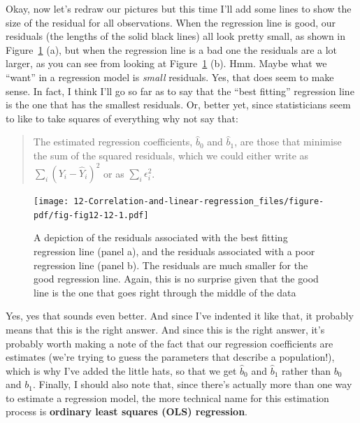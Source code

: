 \documentclass[
  a4paper,
]{book}
\begin{document}
Okay, now let's redraw our pictures but this time I'll add some lines to
show the size of the residual for all observations. When the regression
line is good, our residuals (the lengths of the solid black lines) all
look pretty small, as shown in Figure~\ref{fig-fig12-12} (a), but when
the regression line is a bad one the residuals are a lot larger, as you
can see from looking at Figure~\ref{fig-fig12-12} (b). Hmm. Maybe what
we ``want'' in a regression model is \emph{small} residuals. Yes, that
does seem to make sense. In fact, I think I'll go so far as to say that
the ``best fitting'' regression line is the one that has the smallest
residuals. Or, better yet, since statisticians seem to like to take
squares of everything why not say that:

\begin{quote}
The estimated regression coefficients, \(\hat{b}_0\) and \(\hat{b}_1\),
are those that minimise the sum of the squared residuals, which we could
either write as \(\sum_i (Y_i - \hat{Y}_i)^2\) or as
\(\sum_i \epsilon_i^2\).
\end{quote}

\begin{figure}

\texttt{[image: 12-Correlation-and-linear-regression\_files/figure-pdf/fig-fig12-12-1.pdf]} \hfill{}

\caption{\label{fig-fig12-12}A depiction of the residuals associated
with the best fitting regression line (panel a), and the residuals
associated with a poor regression line (panel b). The residuals are much
smaller for the good regression line. Again, this is no surprise given
that the good line is the one that goes right through the middle of the
data}

\end{figure}

Yes, yes that sounds even better. And since I've indented it like that,
it probably means that this is the right answer. And since this is the
right answer, it's probably worth making a note of the fact that our
regression coefficients are estimates (we're trying to guess the
parameters that describe a population!), which is why I've added the
little hats, so that we get \(\hat{b}_0\) and \(\hat{b}_1\) rather than
\(b_0\) and \(b_1\). Finally, I should also note that, since there's
actually more than one way to estimate a regression model, the more
technical name for this estimation process is \textbf{ordinary least
squares (OLS) regression}.
\end{document}
